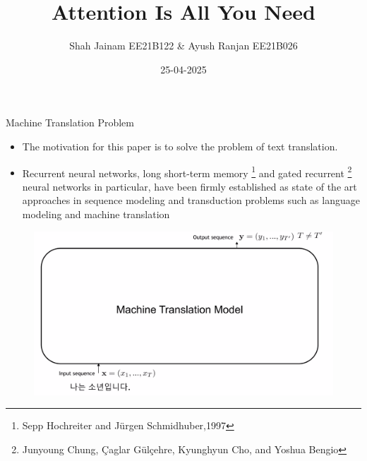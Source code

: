 \documentclass{beamer}
\title[ \hspace{0.5cm}\insertframenumber/\inserttotalframenumber]{Attention Is All You Need}
\author{Shah Jainam EE21B122 \& Ayush Ranjan EE21B026}
\institute{Indian Institute of Technology \\ Madras}
\date{25-04-2025}
\begin{document}
\begin{frame}
  \titlepage
\end{frame}



\begin{frame}{Machine Translation Problem}

\begin{itemize}
    \item The motivation for this paper is to solve the problem of text translation.
    \item  Recurrent neural networks, long short-term memory \footnote{Sepp Hochreiter and Jürgen Schmidhuber,1997} and gated recurrent \footnote{Junyoung Chung, Çaglar Gülçehre, Kyunghyun Cho, and Yoshua Bengio} neural networks in particular, have been firmly established as state of the art approaches in sequence modeling and transduction problems such as language modeling and machine translation
\end{itemize}

\begin{figure}[htbp]
    \centering
    \includegraphics[width=0.6\linewidth]{f1.png}
    \label{fig:enter-label}
\end{figure}
\end{frame}
\end{document}

